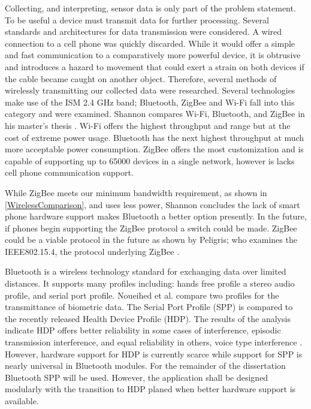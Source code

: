 Collecting, and interpreting, sensor data is only part of the problem statement. To be useful a device must transmit data for further processing. Several standards and architectures for data transmission were considered. A wired connection to a cell phone was quickly discarded. While it would offer a simple and fast communication to a comparatively more powerful device, it is obtrusive and introduces a hazard to movement that could exert a strain on both devices if the cable became caught on another object. Therefore, several methods of wirelessly transmitting our collected data were researched. Several technologies make use of the ISM 2.4 GHz band; Bluetooth, ZigBee and Wi-Fi fall into this category and were examined.  Shannon compares Wi-Fi, Bluetooth, and ZigBee in his master's thesis \cite{Shannon2012}. Wi-Fi offers the highest throughput and range but at the cost of extreme power usage. Bluetooth has the next highest throughput at much more acceptable power consumption. ZigBee offers the most customization and is capable of supporting up to 65000 devices in a single network, however is lacks cell phone communication support.

While ZigBee meets our minimum bandwidth requirement, as shown in \cref{WirelessComparison}, and uses less power, Shannon concludes the lack of smart phone hardware support makes Bluetooth a better option presently. In the future, if phones begin supporting the ZigBee protocol a switch could be made.  ZigBee could be a viable protocol in the future as shown by Peligris; who examines the IEEE802.15.4, the protocol underlying ZigBee \cite{Pelegris2011}.

Bluetooth is a wireless technology standard for exchanging data over limited distances. It supports many profiles including: hands free profile a stereo audio profile, and serial port profile. Noueihed et al. compare two profiles for the transmittance of biometric data. The Serial Port Profile (SPP) is compared to the recently released Health Device Profile (HDP). The results of the analysis indicate HDP offers better reliability in some cases of interference, episodic transmission interference, and equal reliability in others, voice type interference \cite{Noueihed2010}. However, hardware support for HDP is currently scarce while support for SPP is nearly universal in Bluetooth modules. For the remainder of the dissertation Bluetooth SPP will be used. However, the application shall be designed modularly with the transition to HDP planed when better hardware support is available.

